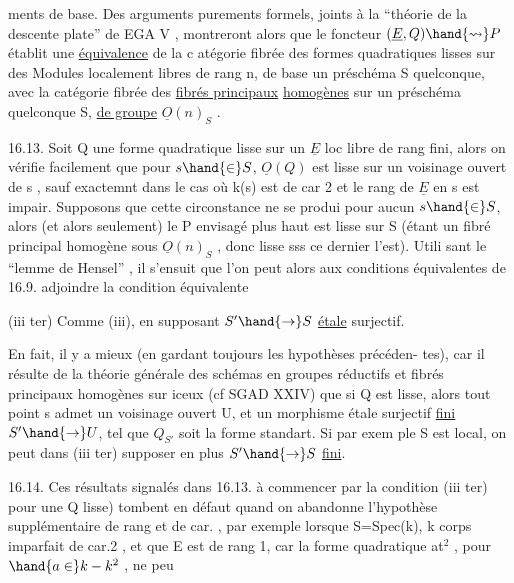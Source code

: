 
ments de base. Des arguments purements formels, joints à la
``théorie de la descente plate'' de EGA V  , montreront alors que le foncteur
$(\underline{E},Q) \hand{\rightsquigarrow} P$ établit une \uline{équivalence} de la c atégorie fibrée des formes
quadratiques lisses sur des Modules localement libres de rang n, de base
un préschéma S quelconque, avec la catégorie fibrée des \uline{fibrés principaux}
\uline{homogènes} sur un préschéma quelconque S, \uline{de groupe} $\underline{O}(n)_S$ .

16.13. Soit Q une forme quadratique lisse sur un $\underline{E}$ loc libre de
rang fini, alors on vérifie facilement que pour $s \hand{\in} S$, $\underline{O}(Q)$ est lisse
sur un voisinage ouvert de s ,  sauf exactemnt dans
le cas où k(s) est de car 2 et le rang de $\underline{E}$ en s est impair. Supposons
que cette circonstance ne se produi pour aucun $s \hand{\in} S$, alors (et alors
seulement) le P envisagé plus haut est lisse sur S (étant un fibré
principal homogène sous $\underline{O}(n)_S$ , donc lisse sss ce dernier l'est). Utili
sant le ``lemme de Hensel'' , il s'ensuit que  l'on peut alors aux
conditions équivalentes de 16.9. adjoindre la condition  équivalente

(iii ter)  Comme (iii), en supposant $S' \hand{\to} S$
\uline{étale} surjectif.

En fait, il y a mieux (en gardant toujours les hypothèses précéden-%
tes), car il résulte de la théorie générale des schémas en groupes réductifs
et fibrés principaux homogènes sur iceux (cf SGAD XXIV) que  si Q est
lisse, alors tout point s admet un voisinage ouvert U, et un morphisme
étale surjectif \uline{fini} $S' \hand{\to} U$, tel que $Q_{S'}$ soit la forme standart. Si par exem
ple S est local, on peut dans (iii ter) supposer en plus $S' \hand{\to} S$ \uline{fini}.

16.14. \hand{(}Ces résultats signalés dans 16.13. \hand{(}à commencer par la condition (iii ter) pour une Q
lisse)\hand{)} tombent en défaut quand on abandonne l'hypothèse supplémentaire
de rang et de car. , par exemple lorsque S=Spec(k), k corps imparfait de car.2 , et
que E est de rang 1, car la forme quadratique at$^{2}$ , pour $\hand{a \in} k - k^{2}$ , ne peu

